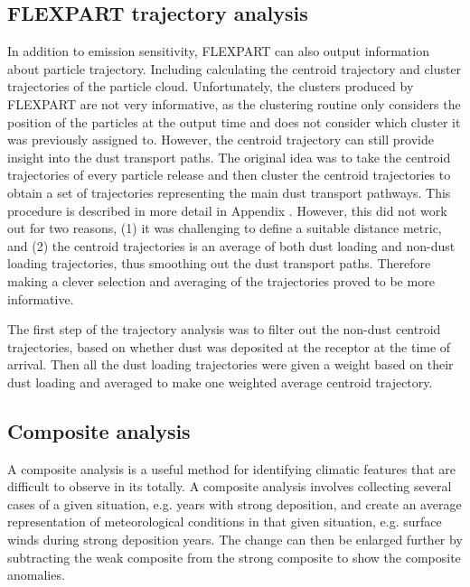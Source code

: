 \subsection{FLEXPART trajectory analysis}
In addition to emission sensitivity, FLEXPART can also output information about particle trajectory. Including calculating the centroid trajectory and cluster trajectories of the particle cloud. 
Unfortunately, the clusters produced by FLEXPART are not very informative, as the clustering routine only considers the position of the particles at the output time and does not consider which cluster it was previously assigned to. However, the centroid trajectory can still provide insight into the dust transport paths. 
The original idea was to take the centroid trajectories of every particle release and then cluster the centroid trajectories to obtain a set of trajectories representing the main dust transport pathways. 
This procedure is described in more detail in Appendix . However, this did not work out for two reasons, (1) it was challenging to define a suitable distance metric, and (2) the centroid trajectories is an average of both dust loading and non-dust loading trajectories, thus smoothing out the dust transport paths. 
Therefore making a clever selection and averaging of the trajectories proved to be more informative. 

The first step of the trajectory analysis was to filter out the non-dust centroid trajectories, based on whether dust was deposited at the receptor at the time of arrival. Then all the dust loading trajectories were given a weight based on their dust loading and averaged to make one weighted average centroid trajectory.      
 

\subsection{Composite analysis}

A composite analysis is a useful method for identifying climatic features that are difficult to observe in its totally. 
A composite analysis involves collecting several cases of a given situation, e.g. years with strong deposition, and create an average representation of meteorological conditions in that given situation, e.g. surface winds during strong deposition years. 
The change can then be enlarged further by subtracting the weak composite from the strong composite to show the composite anomalies. 
     
